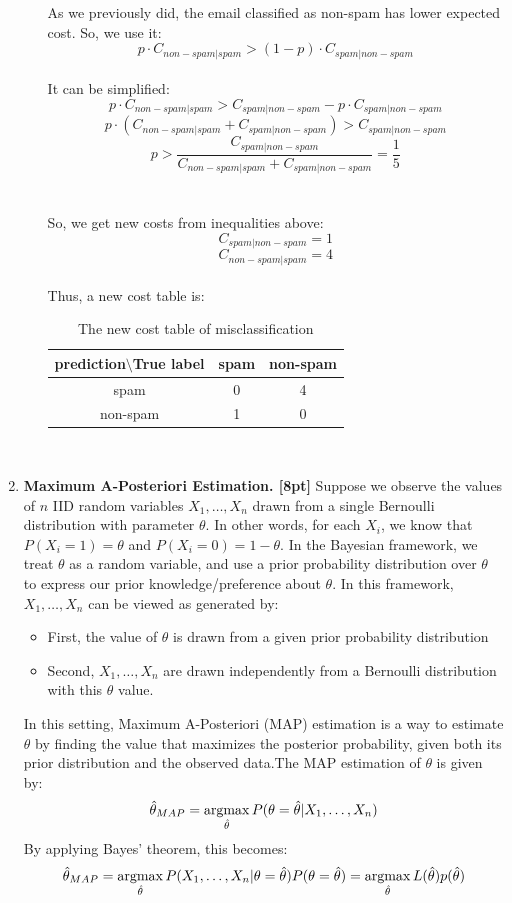 \documentclass{article}
\def\argmax{\mathop{\rm argmax}}
\begin{document}
\begin{enumerate}
\begin{enumerate}
{As we previously did, the email classified as non-spam has lower expected cost. So, we use it:
\[ p \cdot C_{non-spam|spam} > (1-p) \cdot C_{spam|non-spam} \]
\\
It can be simplified: \\
\[ p \cdot C_{non-spam|spam} > C_{spam|non-spam} - p \cdot C_{spam|non-spam} \]
\[ p \cdot (C_{non-spam|spam} + C_{spam|non-spam}) > C_{spam|non-spam} \]
\[ p > \frac{C_{spam|non-spam}}{C_{non-spam|spam} + C_{spam|non-spam}} = \frac{1}{5} \]
\\
\\
So, we get new costs from inequalities above:
\[  C_{spam|non-spam} = 1 \]
\[  C_{non-spam|spam} = 4 \]
\\
Thus, a new cost table is: 
\\
\begin{table}[h]
    \centering
    \begin{tabular}{c|c|c} \hline
       prediction$\setminus$True label & spam & non-spam \\ \hline
         spam & 0 & 4   \\ \hline
         non-spam & 1 & 0 \\ \hline
    \end{tabular}
    \caption{The new cost table of misclassification}
    \label{tab:my_label}
\end{table}
\\}

\end{enumerate}

\item \textbf{Maximum A-Posteriori Estimation. [8pt]}
Suppose we observe the values of $n$ IID random variables $X_1, \dots , X_n$ drawn from a single Bernoulli
distribution with parameter $\theta$. In other words, for each $X_i$, we know that $P(X_i = 1) =\theta$ and $P(X_i = 0) = 1- \theta$.
In the Bayesian framework, we treat $\theta$ as a random variable, and use a prior probability distribution over $\theta$ to express our prior knowledge/preference about $\theta$. In this framework,  $X_1, \dots, X_n$ can be viewed as generated by:
\begin{itemize}
\item First, the value of $\theta$ is drawn from a given prior probability distribution
\item Second, $X_1, \dots, X_n$ are drawn independently from a Bernoulli distribution with this $\theta$ value.
\end{itemize}
In this setting, Maximum A-Posteriori (MAP) estimation  is a way to estimate $\theta$ by finding the value that maximizes the posterior probability, given both its prior distribution and the observed data.The MAP estimation of $\theta$ is given by:
\[
\hat{\theta}_{MAP} = \argmax_{\hat{\theta}}P(\theta=\hat{\theta}|X_1,\dots, X_n)\]
By applying Bayes' theorem, this becomes:
\[\hat{\theta}_{MAP}=\argmax_{\hat{\theta}}P(X_1,\dots,X_n|\theta = \hat{\theta} )P(\theta=\hat{\theta}) = \argmax_{\hat{\theta}}L(\hat{\theta})p(\hat{\theta})\]


\end{enumerate}
\end{document}
